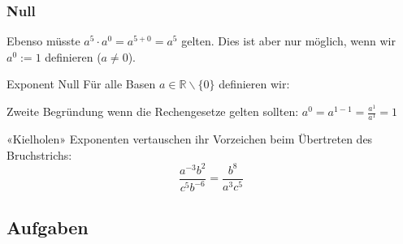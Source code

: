 \newpage



\subsubsection{Null}

Ebenso müsste $a^5 \cdot a^0 = a^{5+0} = a^5$ gelten. Dies ist aber
nur möglich, wenn wir $a^0 := 1$ definieren ($a\ne 0$).

\begin{definition}{Exponent Null}{} Für alle Basen
$a \in \mathbb{R}\backslash\{0\}$ definieren wir:
\begin{center}
\end{center}
\end{definition}

Zweite Begründung wenn die Rechengesetze gelten sollten: $a^0 = a^{1-1} = \frac{a^1}{a^1} = 1$


 




\begin{rezept*}{«Kielholen»}{}{}
Exponenten vertauschen ihr Vorzeichen beim Übertreten des Bruchstrichs:
$$\frac{a^{-3}b^2}{c^5b^{-6}} = \frac{b^8}{a^3c^5}$$
\end{rezept*}



\subsection{Aufgaben}



